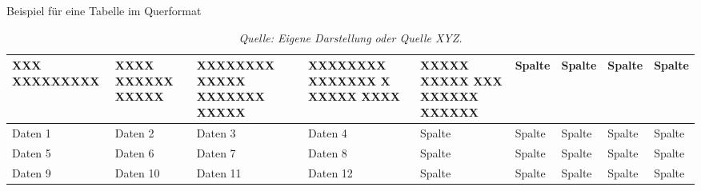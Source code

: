 \documentclass{article}
\begin{document}
\lipsum[1] %

\begin{landscape} %
    \def\maxlenth{0.80in} %
        \begin{table}
            \centering
            \thispagestyle{empty} %
           
            \caption{Beispiel für eine Tabelle im Querformat} %
            \label{tab:example_table} %
            
            \begin{tabular}{|p{\maxlenth}|p{\maxlenth}|p{\maxlenth}|p{\maxlenth}|p{\maxlenth}|p{\maxlenth}|p{\maxlenth}|p{\maxlenth}|p{\maxlenth}|}
                \hline
                XXX XXXXXXXXX & XXXX XXXXXX XXXXX & XXXXXXXX XXXXX XXXXXXX XXXXX & XXXXXXXX XXXXXXX X XXXXX XXXX & XXXXX XXXXX XXX XXXXXX XXXXXX & Spalte & Spalte & Spalte & Spalte \\ \hline
                Daten 1  & Daten 2  & Daten 3  & Daten 4  & Spalte & Spalte & Spalte & Spalte & Spalte \\ \hline
                Daten 5  & Daten 6  & Daten 7  & Daten 8  & Spalte & Spalte & Spalte & Spalte & Spalte \\ \hline
                Daten 9  & Daten 10 & Daten 11 & Daten 12 & Spalte & Spalte & Spalte & Spalte & Spalte \\ \hline
            \end{tabular}
            \vspace{0.5cm} %
            \caption*{\textit{Quelle: Eigene Darstellung oder Quelle XYZ.}} %
        \end{table}
        \restoregeometry %
\end{landscape}

\lipsum[2] %
\end{document}
